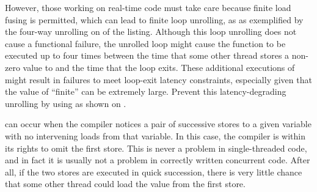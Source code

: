 \begin{description}[labelsep=.4em]
\begin{fcvref}
However, those working on real-time code must take care because finite
load fusing is permitted, which can lead to finite loop unrolling,
as as exemplified by the four-way unrolling on  of
the listing.
Although this loop unrolling does not cause a functional failure, the
unrolled loop might cause the  function to be
executed up to four times between the time that some other thread stores
a non-zero value to  and the time that the loop exits.
These additional executions of  might result
in failures to meet loop-exit latency constraints, especially given that
the value of ``finite'' can be extremely large.
Prevent this latency-degrading unrolling by using 
as shown on .
\end{fcvref}

\QuickQuizEnd

\item[Store fusing] can occur when the compiler notices a pair of successive
stores to a given variable with no intervening loads from that variable.
In this case, the compiler is within its rights to omit the first store.
This is never a problem in single-threaded code, and in fact it is
usually not a problem in correctly written concurrent code.
After all, if the two stores are executed in quick succession, there is
very little chance that some other thread could load the value from the
first store.


\end{description}

